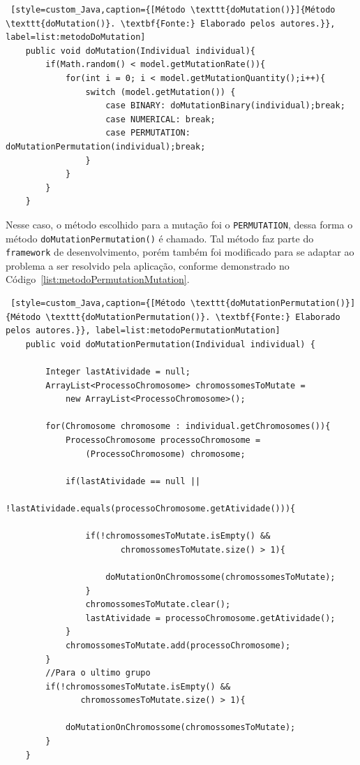 \begin{lstlisting} [style=custom_Java,caption={[Método \texttt{doMutation()}]{Método \texttt{doMutation()}. \textbf{Fonte:} Elaborado pelos autores.}}, label=list:metodoDoMutation] 
	public void doMutation(Individual individual){
		if(Math.random() < model.getMutationRate()){
			for(int i = 0; i < model.getMutationQuantity();i++){
				switch (model.getMutation()) {
					case BINARY: doMutationBinary(individual);break;
					case NUMERICAL: break;
					case PERMUTATION: doMutationPermutation(individual);break;
				}
			}
		}
	}

\end{lstlisting}

\par Nesse caso, o método escolhido para a mutação foi o \texttt{PERMUTATION}, dessa forma o método \texttt{doMutationPermutation()} é chamado.
Tal método faz parte do \texttt{framework} de desenvolvimento, porém também foi modificado para se adaptar ao problema a ser resolvido pela 
aplicação, conforme demonstrado no Código~\ref{list:metodoPermutationMutation}.


\begin{lstlisting} [style=custom_Java,caption={[Método \texttt{doMutationPermutation()}]{Método \texttt{doMutationPermutation()}. \textbf{Fonte:} Elaborado pelos autores.}}, label=list:metodoPermutationMutation] 
	public void doMutationPermutation(Individual individual) {
	
		Integer lastAtividade = null;
		ArrayList<ProcessoChromosome> chromossomesToMutate = 
			new ArrayList<ProcessoChromosome>(); 
		
		for(Chromosome chromosome : individual.getChromosomes()){
			ProcessoChromosome processoChromosome = 
				(ProcessoChromosome) chromosome;
			
			if(lastAtividade == null || 
				   !lastAtividade.equals(processoChromosome.getAtividade())){
				   
				if(!chromossomesToMutate.isEmpty() && 
					   chromossomesToMutate.size() > 1){
					
					doMutationOnChromossome(chromossomesToMutate);
				}
				chromossomesToMutate.clear();
				lastAtividade = processoChromosome.getAtividade();
			}
			chromossomesToMutate.add(processoChromosome);
		}
		//Para o ultimo grupo
		if(!chromossomesToMutate.isEmpty() && 
			   chromossomesToMutate.size() > 1){
			
			doMutationOnChromossome(chromossomesToMutate);
		}
	}

\end{lstlisting}

